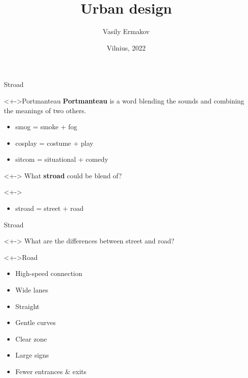 \documentclass{beamer}
\begin{document}
    \title{Urban design}
    \author{Vasily Ermakov}
    \date{Vilnius, 2022}
    \frame{\titlepage}

    \begin{frame}{Stroad}
        \begin{block}
            <+->{Portmanteau}
            \textbf{Portmanteau} is a word blending the sounds and combining the meanings of two others.\\
            \begin{itemize}
                \item smog = smoke + fog
                \item cosplay = costume + play
                \item sitcom = situational + comedy
            \end{itemize}
        \end{block}
        \begin{block}
            <+->{}
            What \textbf{stroad} could be blend of?
        \end{block}
        \begin{block}
            <+->{}
            \begin{itemize}
                \item stroad = street + road
            \end{itemize}
        \end{block}
    \end{frame}

    \begin{frame}{Stroad}
        \begin{block}
            <+->{}
            What are the differences between street and road?
        \end{block}
        \begin{block}
            <+->{Road}
            \begin{itemize}
                \item High-speed connection
                \item Wide lanes
                \item Straight
                \item Gentle curves
                \item Clear zone
                \item Large signs
                \item Fewer entrances \& exits
            \end{itemize}
        \end{block}
    \end{frame}
\end{document}
